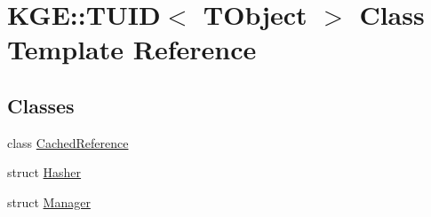 \hypertarget{class_k_g_e_1_1_t_u_i_d}{\section{K\-G\-E\-:\-:T\-U\-I\-D$<$ T\-Object $>$ Class Template Reference}
\label{class_k_g_e_1_1_t_u_i_d}
}
\subsection*{Classes}
\begin{DoxyCompactItemize}
\item 
class \hyperlink{class_k_g_e_1_1_t_u_i_d_1_1_cached_reference}{Cached\-Reference}
\item 
struct \hyperlink{struct_k_g_e_1_1_t_u_i_d_1_1_hasher}{Hasher}
\item 
struct \hyperlink{struct_k_g_e_1_1_t_u_i_d_1_1_manager}{Manager}
\end{DoxyCompactItemize}
